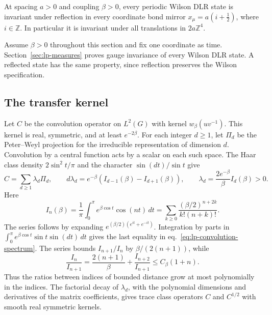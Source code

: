 \documentclass[11pt,letterpaper,reqno]{amsart}
\makeatletter
\numberwithin{equation}{section}
\renewcommand{\eqref}[1]{\textup{eq.~\ref{#1}}}
\theoremstyle{definition}
\newcommand{\ms@majorstart}{%
  \pushQED{\qed}\renewcommand{\qedsymbol}{$\blacksquare\square$}}
\newenvironment{theorem}[1][]{\ms@majorstart\ms@theorem[#1]}
  {\popQED\endms@theorem}
\theoremstyle{remark}
\makeatother
\begin{document}
\begin{theorem}[Bond-reflection symmetry]\label{lp:thm-link-symmetry}
At spacing \(a>0\) and coupling \(\beta>0\), every periodic Wilson
DLR state is invariant under reflection in every coordinate bond
mirror \(x_\mu=a(i+\tfrac12)\), where \(i\in\mathbb Z\). In particular it is
invariant under all translations in \(2a\mathbb Z^4\).
\end{theorem}

Assume \(\beta>0\) throughout this section and fix one coordinate
as time. Section~\ref{sec:lp-measures} proves
gauge invariance of every Wilson DLR state. A reflected state has
the same property, since reflection preserves the Wilson specification.

\subsection{The transfer kernel}

Let \(C\) be the convolution operator on \(L^2(G)\) with kernel
\(w_\beta(uv^{-1})\). This kernel is real, symmetric, and at least
\(e^{-2\beta}\). For each integer \(d\ge1\), let \(\Pi_d\) be the
Peter--Weyl projection for the irreducible representation of dimension
\(d\). Convolution by a central function acts by a scalar on each
such space. The Haar class density \(2\sin^2 t/\pi\) and the
character \(\sin(dt)/\sin t\) give
\begin{equation}\label{eq:lp-convolution-spectrum}
 C=\sum_{d\ge1}\lambda_d\Pi_d,\qquad
 d\lambda_d=e^{-\beta}(I_{d-1}(\beta)-I_{d+1}(\beta)),\qquad
 \lambda_d=\frac{2e^{-\beta}}{\beta}I_d(\beta)>0 .
\end{equation}
Here
\[
 I_n(\beta)=\frac1\pi\int_0^\pi e^{\beta\cos t}\cos(nt)\,dt
     =\sum_{k\ge0}\frac{(\beta/2)^{n+2k}}{k!(n+k)!}.
\]
The series follows by expanding
\(e^{(\beta/2)(e^{it}+e^{-it})}\). Integration by parts in
\(\int_0^\pi e^{\beta\cos t}\sin t\sin(dt)\,dt\) gives the
last equality in \eqref{eq:lp-convolution-spectrum}.
The series bounds \(I_{n+1}/I_n\) by \(\beta/(2(n+1))\), while
\[
 \frac{I_n}{I_{n+1}}
     =\frac{2(n+1)}{\beta}+\frac{I_{n+2}}{I_{n+1}}
     \le C_\beta(1+n).
\]
Thus the ratios between indices of bounded distance grow at most
polynomially in the indices. The factorial decay of \(\lambda_d\),
with the polynomial dimensions and derivatives of the matrix
coefficients, gives trace class operators \(C\) and \(C^{1/2}\) with
smooth real symmetric kernels.
\end{document}

